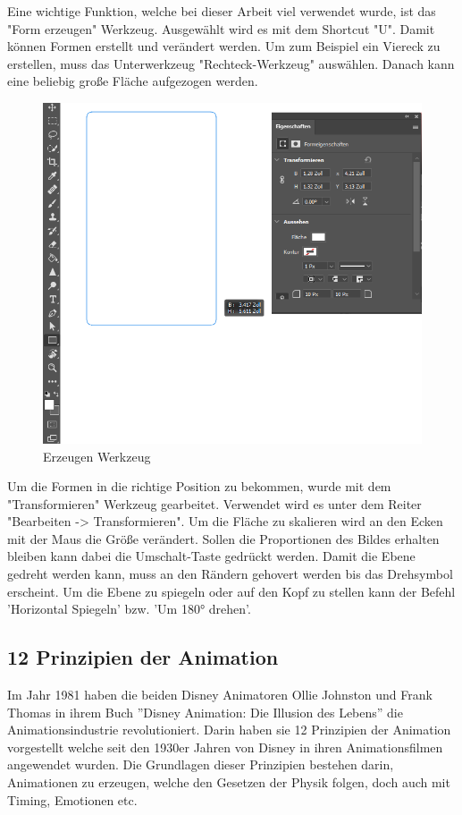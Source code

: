Eine wichtige Funktion, welche bei dieser Arbeit viel verwendet wurde, ist das "Form erzeugen" Werkzeug. Ausgewählt wird es mit dem Shortcut "U". Damit können Formen erstellt und verändert werden. Um zum Beispiel ein Viereck zu erstellen, muss das Unterwerkzeug "Rechteck-Werkzeug" auswählen. Danach
kann eine beliebig große Fläche aufgezogen werden.
\begin{figure}[H]
    \centering
    \includegraphics[scale=0.7]{pics/erzeugen.png}
    \caption{Erzeugen Werkzeug}
\end{figure}

Um die Formen in die richtige Position zu bekommen, wurde mit dem "Transformieren" Werkzeug
gearbeitet. Verwendet wird es unter dem Reiter "Bearbeiten -> Transformieren".
Um die Fläche zu skalieren wird an den Ecken mit der Maus die Größe verändert. Sollen die Proportionen des Bildes erhalten bleiben
kann dabei die Umschalt-Taste gedrückt werden. Damit die Ebene gedreht werden kann, muss an den Rändern gehovert werden bis das Drehsymbol erscheint.
Um die Ebene zu spiegeln oder auf den Kopf zu stellen kann der Befehl 'Horizontal Spiegeln' bzw. 'Um 180° drehen'.

\subsection{12 Prinzipien der Animation}
Im Jahr 1981 haben die beiden Disney Animatoren Ollie Johnston und Frank Thomas in ihrem Buch ''Disney Animation: Die Illusion des Lebens'' die Animationsindustrie revolutioniert.
Darin haben sie 12 Prinzipien der Animation vorgestellt welche seit den 1930er Jahren von Disney in ihren Animationsfilmen angewendet wurden.
Die Grundlagen dieser Prinzipien bestehen darin, Animationen zu erzeugen, welche den Gesetzen der Physik folgen, doch auch mit Timing, Emotionen etc.

